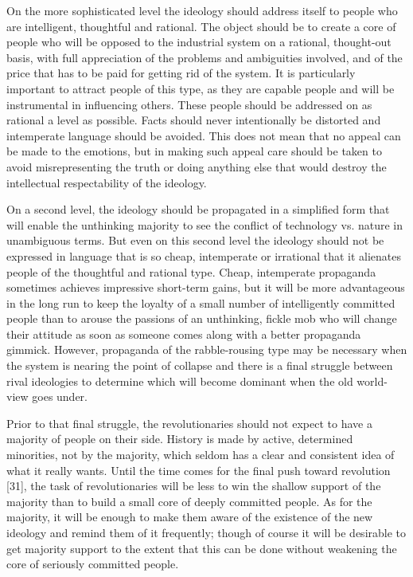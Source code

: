  On the more sophisticated level the ideology should address itself to people who are intelligent, thoughtful and rational. The object should be to create a core of people who will be opposed to the industrial system on a rational, thought-out basis, with full appreciation of the problems and ambiguities involved, and of the price that has to be paid for getting rid of the system. It is particularly important to attract people of this type, as they are capable people and will be instrumental in influencing others. These people should be addressed on as rational a level as possible. Facts should never intentionally be distorted and intemperate language should be avoided. This does not mean that no appeal can be made to the emotions, but in making such appeal care should be taken to avoid misrepresenting the truth or doing anything else that would destroy the intellectual respectability of the ideology.

 On a second level, the ideology should be propagated in a simplified form that will enable the unthinking majority to see the conflict of technology vs. nature in unambiguous terms. But even on this second level the ideology should not be expressed in language that is so cheap, intemperate or irrational that it alienates people of the thoughtful and rational type. Cheap, intemperate propaganda sometimes achieves impressive short-term gains, but it will be more advantageous in the long run to keep the loyalty of a small number of intelligently committed people than to arouse the passions of an unthinking, fickle mob who will change their attitude as soon as someone comes along with a better propaganda gimmick. However, propaganda of the rabble-rousing type may be necessary when the system is nearing the point of collapse and there is a final struggle between rival ideologies to determine which will become dominant when the old world-view goes under.

 Prior to that final struggle, the revolutionaries should not expect to have a majority of people on their side. History is made by active, determined minorities, not by the majority, which seldom has a clear and consistent idea of what it really wants. Until the time comes for the final push toward revolution [31], the task of revolutionaries will be less to win the shallow support of the majority than to build a small core of deeply committed people. As for the majority, it will be enough to make them aware of the existence of the new ideology and remind them of it frequently; though of course it will be desirable to get majority support to the extent that this can be done without weakening the core of seriously committed people.

